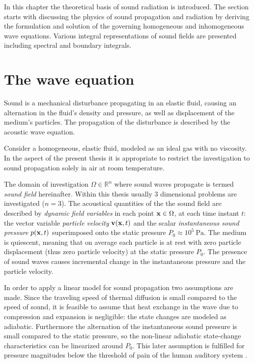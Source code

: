 In this chapter the theoretical basis of sound radiation is introduced. 
The section starts with discussing the physics of sound propagation and radiation by deriving the formulation and solution of the governing homogeneous and inhomogeneous wave equations. 
Various integral representations of sound fields are presented including spectral and boundary integrals.
%

\section{The wave equation}

Sound is a mechanical disturbance propagating in an elastic fluid, causing an alternation in the fluid's density and pressure, as well as displacement of the medium's particles.
The propagation of the disturbance is described by the acoustic wave equation.

Consider a homogeneous, elastic fluid, modeled as an ideal gas with no viscosity. 
In the aspect of the present thesis it is appropriate to restrict the investigation to sound propagation solely in air at room temperature.

The domain of investigation $\Omega \in \mathbb{R}^n$ where sound waves propagate is termed \emph{sound field} hereinafter.
Within this thesis usually 3 dimensional problems are investigated ($n = 3$).
The acoustical quantities of the the sound field are described by \emph{dynamic field variables} in each point $\mathbf{x} \in \Omega$, at each time instant $t$: the vector variable \emph{particle velocity} $\mathbf{v}(\mathbf{x},t)$ and the scalar \emph{instantaneous sound pressure} $p(\mathbf{x},t)$ superimposed onto the static pressure $P_0 \approx 10^5~\mathrm{Pa}$.
The medium is quiescent, meaning that on average each particle is at rest with zero particle displacement (thus zero particle velocity) at the static pressure $P_0$. 
The presence of sound waves causes incremental change in the instantaneous pressure and the particle velocity.

In order to apply a linear model for sound propagation two assumptions are made.
Since the traveling speed of thermal diffusion is small compared to the speed of sound, it is feasible to assume that heat exchange in the wave due to compression and expansion is negligible: the state changes are modeled as adiabatic.
Furthermore the alternation of the instantaneous sound pressure is small compared to the static pressure, so the non-linear adiabatic state-change characteristics can be linearized around $P_0$.
This later assumption is fulfilled for pressure magnitudes below the threshold of pain of the human auditory system \cite{Gumerov2004, Ahrens2012}.

